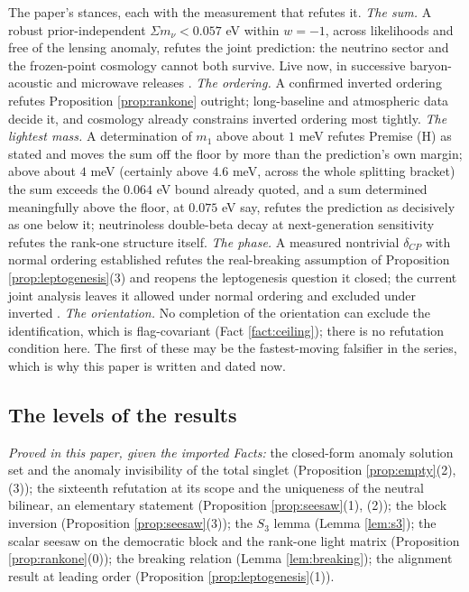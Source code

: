 \documentclass[11pt]{article}
\theoremstyle{definition}
\newcommand{\mnu}{\Sigma m_{\nu}}
\begin{document}
The paper's stances, each with the measurement that refutes it. \emph{The sum.} A robust prior-independent $\mnu < 0.057$ eV within $w = -1$, across likelihoods and free of the lensing anomaly, refutes the joint prediction: the neutrino sector and the frozen-point cosmology cannot both survive. Live now, in successive baryon-acoustic and microwave releases \cite{DESI2025, HouWangZhaoZhang2026}. \emph{The ordering.} A confirmed inverted ordering refutes Proposition \ref{prop:rankone} outright; long-baseline and atmospheric data decide it, and cosmology already constrains inverted ordering most tightly. \emph{The lightest mass.} A determination of $m_{1}$ above about $1$ meV refutes Premise (H) as stated and moves the sum off the floor by more than the prediction's own margin; above about $4$ meV (certainly above $4.6$ meV, across the whole splitting bracket) the sum exceeds the $0.064$ eV bound already quoted, and a sum determined meaningfully above the floor, at $0.075$ eV say, refutes the prediction as decisively as one below it; neutrinoless double-beta decay at next-generation sensitivity refutes the rank-one structure itself. \emph{The phase.} A measured nontrivial $\delta_{CP}$ with normal ordering established refutes the real-breaking assumption of Proposition \ref{prop:leptogenesis}(3) and reopens the leptogenesis question it closed; the current joint analysis leaves it allowed under normal ordering and excluded under inverted \cite{T2KNOvA2025}. \emph{The orientation.} No completion of the orientation can exclude the identification, which is flag-covariant (Fact \ref{fact:ceiling}); there is no refutation condition here. The first of these may be the fastest-moving falsifier in the series, which is why this paper is written and dated now.

\subsection*{The levels of the results}

\emph{Proved in this paper, given the imported Facts:} the closed-form anomaly solution set and the anomaly invisibility of the total singlet (Proposition \ref{prop:empty}(2), (3)); the sixteenth refutation at its scope and the uniqueness of the neutral bilinear, an elementary statement (Proposition \ref{prop:seesaw}(1), (2)); the block inversion (Proposition \ref{prop:seesaw}(3)); the $S_{3}$ lemma (Lemma \ref{lem:s3}); the scalar seesaw on the democratic block and the rank-one light matrix (Proposition \ref{prop:rankone}(0)); the breaking relation (Lemma \ref{lem:breaking}); the alignment result at leading order (Proposition \ref{prop:leptogenesis}(1)).
\end{document}

